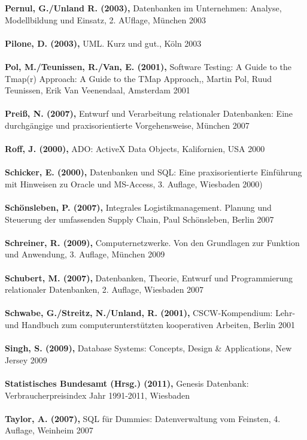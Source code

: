 \textbf{Pernul, G./Unland R. (2003),} Datenbanken im Unternehmen: Analyse, Modellbildung und Einsatz, 2. AUflage, München 2003\\\\
\textbf{Pilone, D. (2003),} UML. Kurz und gut., Köln 2003\\\\
\textbf{Pol, M./Teunissen, R./Van, E. (2001),} Software Testing: A Guide to the Tmap(r) Approach: A Guide to the TMap Approach,, Martin Pol, Ruud Teunissen, Erik Van Veenendaal, Amsterdam 2001\\\\
\textbf{Preiß, N. (2007),} Entwurf und Verarbeitung relationaler Datenbanken: Eine durchgängige und praxisorientierte Vorgehensweise, München 2007\\\\
\textbf{Roff, J. (2000),} ADO: ActiveX Data Objects, Kalifornien, USA 2000\\\\
\textbf{Schicker, E. (2000),} Datenbanken und SQL: Eine praxisorientierte Einführung mit Hinweisen zu Oracle und MS-Access, 3. Auflage, Wiesbaden 2000)\\\\
\textbf{Schönsleben, P. (2007),} Integrales Logistikmanagement. Planung und Steuerung der umfassenden Supply Chain, Paul Schönsleben, Berlin 2007\\\\
\textbf{Schreiner, R. (2009),} Computernetzwerke. Von den Grundlagen zur Funktion und Anwendung, 3. Auflage, München 2009\\\\
\textbf{Schubert, M. (2007),} Datenbanken, Theorie, Entwurf und Programmierung relationaler Datenbanken, 2. Auflage, Wiesbaden 2007\\\\
\textbf{Schwabe, G./Streitz, N./Unland, R. (2001),} CSCW-Kompendium: Lehr- und Handbuch zum computerunterstützten kooperativen Arbeiten, Berlin 2001\\\\
\textbf{Singh, S. (2009),} Database Systems: Concepts, Design \& Applications, New Jersey 2009\\\\
\textbf{Statistisches Bundesamt (Hrsg.) (2011),} Genesis Datenbank: Verbraucherpreisindex Jahr 1991-2011, Wiesbaden\\\\
\textbf{Taylor, A. (2007),} SQL für Dummies: Datenverwaltung vom Feinsten, 4. Auflage, Weinheim 2007\\\\
